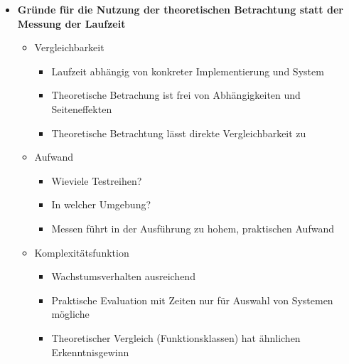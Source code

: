 \begin{itemize}
        \item \textbf{Gründe für die Nutzung der theoretischen Betrachtung statt der Messung der Laufzeit }
            \begin{itemize}
                \item Vergleichbarkeit
                    \begin{itemize}
                        \item Laufzeit abhängig von konkreter Implementierung und System
                        \item Theoretische Betrachung ist frei von Abhängigkeiten und Seiteneffekten
                        \item Theoretische Betrachtung lässt direkte Vergleichbarkeit zu
                    \end{itemize}
                
                \item Aufwand
                    \begin{itemize}
                        \item Wieviele Testreihen?
                        \item In welcher Umgebung?
                        \item Messen führt in der Ausführung zu hohem, praktischen Aufwand
                    \end{itemize}
                
                \item Komplexitätsfunktion
                    \begin{itemize}
                        \item Wachstumsverhalten ausreichend
                        \item Praktische Evaluation mit Zeiten nur für Auswahl von Systemen mögliche
                        \item Theoretischer Vergleich (Funktionsklassen) hat ähnlichen Erkenntnisgewinn
                    \end{itemize}
            \end{itemize}
    \end{itemize}

